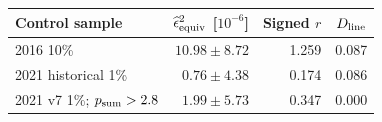 \begin{tabular}{lrrr}\toprule
Control sample & $\widehat\epsilon^2_{\rm equiv}$ [$10^{-6}$] & Signed $r$ & $D_{\rm line}$\\\midrule
2016 10\% & $10.98\pm8.72$ & 1.259 & 0.087\\
2021 historical 1\% & $0.76\pm4.38$ & 0.174 & 0.086\\
2021 v7 1\%; $p_{\rm sum}>2.8$ & $1.99\pm5.73$ & 0.347 & 0.000\\
\bottomrule\end{tabular}
